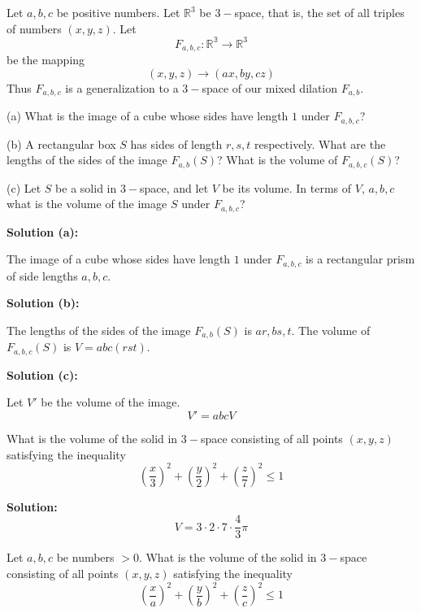 \begin{tcolorbox}[title=Problem 11, breakable]
    Let $a, b, c$ be positive numbers. Let $\mathbb{R}^3$ be $3-$space,
    that is, the set of all triples of numbers $(x, y, z)$. Let 
    \[F_{a, b, c}: \mathbb{R^3} \rightarrow \mathbb{R}^3\]
    be the mapping
    \[(x, y, z) \rightarrow (ax, by, cz)\]
    Thus $F_{a, b, c}$ is a generalization to a $3-$space of our mixed 
    dilation $F_{a, b}$.

    (a) What is the image of a cube whose sides have length $1$ under $F_{a, b, c}$?
    
    (b) A rectangular box $S$ has sides of length $r, s, t$ respectively.
        What are the lengths of the sides of the image $F_{a, b}(S)$?
        What is the volume of $F_{a, b, c}(S)$?

    (c) Let $S$ be a solid in $3-$space, and let $V$ be its volume. 
        In terms of $V$, $a, b, c$ what is the volume of the image $S$
        under $F_{a, b, c}$?
\end{tcolorbox}

\textbf{Solution (a):}

The image of a cube whose sides have length $1$ under $F_{a, b, c}$
is a rectangular prism of side lengths $a, b, c$.

\textbf{Solution (b):}

The lengths of the sides of the image $F_{a, b}(S)$ is $ar, bs, t$.
The volume of $F_{a, b, c}(S)$ is $V = abc(rst)$.

\textbf{Solution (c):}

Let $V'$ be the volume of the image.
\[V' = abc V\]

\begin{tcolorbox}[title=Problem 12, breakable]
    What is the volume of the solid in $3-$space consisting of all points
    $(x, y, z)$ satisfying the inequality
    \[\left(\frac{x}{3}\right)^2 + \left(\frac{y}{2}\right)^2 + \left(\frac{z}{7}\right)^2 \le 1\]
\end{tcolorbox}

\textbf{Solution:}
\[V = 3 \cdot 2 \cdot 7 \cdot \frac{4}{3} \pi\]

\begin{tcolorbox}[title=Problem 14, breakable]
    Let $a, b, c$ be numbers $>0$. What is the volume of the solid 
    in $3-$space consisting of all points $(x, y, z)$ satisfying
    the inequality
    \[\left(\frac{x}{a}\right)^2 + \left(\frac{y}{b}\right)^2 + \left(\frac{z}{c}\right)^2 \le 1\]
\end{tcolorbox}

